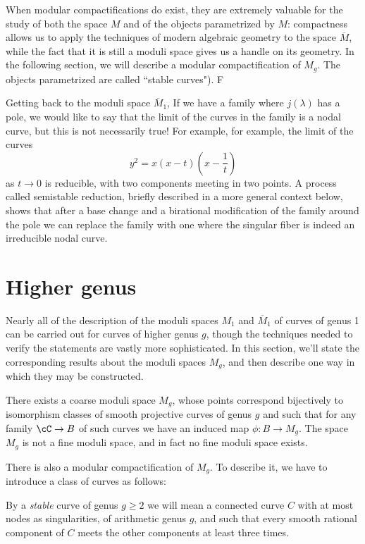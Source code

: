 When modular compactifications do exist, they are extremely valuable for the study of both the space $M$ and of the objects parametrized by $M$: compactness allows us to apply the techniques of modern algebraic geometry to the space $\overline M$, while the fact that it is still a moduli space gives us a handle on its geometry. In the following section, we will describe a modular compactification of $M_g$. The objects parametrized are called ``stable curves"). F

Getting back to the moduli space $\overline M_1$, If we have a family where
$j(\lambda)$ has a pole, we would like to say that the limit of the curves in the family is a nodal curve,
but this is not necessarily true! For example, for example, the limit of the curves
$$
y^2 = x(x-t)(x-\frac{1}{t})
$$
as $t \to 0$ is reducible, with two components meeting in two points. A process called semistable reduction, briefly described in a more general context below, shows that after a base change and a birational
modification of the family around the pole we can replace the family with one where the singular fiber
is indeed an irreducible nodal curve.

\section{Higher genus}

Nearly all of the description of the moduli spaces $M_1$ and $\overline M_1$ of curves of genus 1 can be carried out for curves of higher genus $g$,  though the techniques needed to verify the statements are vastly more sophisticated. In this section, we'll state the corresponding results about the moduli spaces $M_g$, and then describe one way in which they may be constructed.

\begin{theorem}\label{moduli}
There exists a coarse moduli space $M_g$, whose points correspond bijectively to isomorphism classes of smooth projective curves of genus $g$ and such that for any family $\cC \to B$ of such curves we have an induced map $\phi : B \to M_g$. The space $M_g$ is not a fine moduli space, and in fact no fine moduli space exists.
\end{theorem}


There is also a modular compactification of $M_g$. To describe it, we have to introduce a class of curves as follows:

\begin{definition}
By a \emph{stable} curve of genus $g \geq 2$ we will mean a connected curve $C$ with at most nodes as singularities, of arithmetic genus $g$, and such that every smooth rational component of $C$ meets the other components at least three times.
\end{definition}

